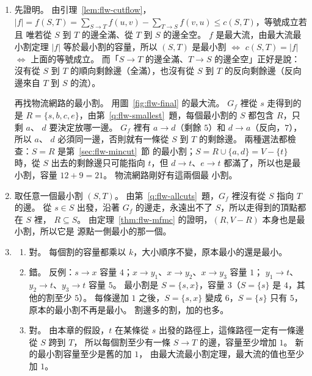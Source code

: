 \begin{enumerate}
第 1 輪 $1 \to 3$、$3 \to t$ 同時滿了（瓶頸 $4$）；第 2 輪 $s \to 1$ 滿了，之後 $1$ 只能經
過 $2 \to 3$ 和反向邊 $3 \to 1$ 到達，距離變成 $3$。 第 4 輪的路徑經過反向邊 $3 \to 1$：
$1 \to 3$ 上的 $4$ 單位退回 $2$ 單位，改走 $1 \to 4 \to t$，$3$ 少掉的由 $2 \to 3$ 補上。
最後的流量：$s \to 1$：$5$、$s \to 2$：$4$、$1 \to 2$：$0$、$1 \to 3$：$2$、$1 \to 4$：
$3$、$2 \to 3$：$2$、$2 \to 4$：$2$、$4 \to 3$：$0$、$3 \to t$：$4$、$4 \to t$：$5$，值 $9$。
最小割 $S = \{s, 2\}$、$T = \{1, 3, 4, t\}$，割邊 $s \to 1$、$2 \to 3$、$2 \to 4$，容量
$5 + 2 + 2 = 9$；從 $T$ 指回 $S$ 的 $1 \to 2$ 不算，它的流量是 $0$。 這張網路的最小割只有這
一個（可以用第~\ref{q:flw-allcuts}~題的方法驗證）。

\item 先證明。 由引理~\ref{lem:flw-cutflow}，
$|f| = f(S, T) = \sum_{S \to T} f(u, v) - \sum_{T \to S} f(v, u) \le c(S, T)$，等號成立若且
唯若從 $S$ 到 $T$ 的邊全滿、從 $T$ 到 $S$ 的邊全空。 $f$ 是最大流，由最大流最小割定理
$|f|$ 等於最小割的容量，所以 $(S, T)$ 是最小割 $\Leftrightarrow$ $c(S, T) = |f|$
$\Leftrightarrow$ 上面的等號成立。 而「$S \to T$ 的邊全滿、$T \to S$ 的邊全空」正好是說：
沒有從 $S$ 到 $T$ 的順向剩餘邊（全滿），也沒有從 $S$ 到 $T$ 的反向剩餘邊（反向邊來自 $T$
到 $S$ 的流）。

再找物流網路的最小割。 用圖~\ref{fig:flw-final} 的最大流。 $G_f$ 裡從 $s$ 走得到的是
$R = \{s, b, c, e\}$，由第~\ref{q:flw-smallest}~題，每個最小割的 $S$ 都包含 $R$，只剩 $a$、
$d$ 要決定放哪一邊。 $G_f$ 裡有 $a \to d$（剩餘 $5$）和 $d \to a$（反向，$7$），所以 $a$、
$d$ 必須同一邊，否則就有一條從 $S$ 到 $T$ 的剩餘邊。 兩種選法都檢查：$S = R$ 是第~\ref{sec:flw-mincut}~節
的最小割；$S = R \cup \{a, d\} = V - \{t\}$ 時，從 $S$ 出去的剩餘邊只可能指向 $t$，但
$d \to t$、$e \to t$ 都滿了，所以也是最小割，容量 $12 + 9 = 21$。 物流網路剛好有這兩個最
小割。

\item 取任意一個最小割 $(S, T)$。 由第~\ref{q:flw-allcuts}~題，$G_f$ 裡沒有從 $S$ 指向 $T$
的邊。 從 $s \in S$ 出發，沿著 $G_f$ 的邊走，永遠出不了 $S$，所以走得到的頂點都在 $S$ 裡，
$R \subseteq S$。 由定理~\ref{thm:flw-mfmc} 的證明，$(R, V - R)$ 本身也是最小割，所以它是
源點一側最小的那一個。

\item
\begin{enumerate}
\item 對。 每個割的容量都乘以 $k$，大小順序不變，原本最小的還是最小。
\item 錯。 反例：$s \to x$ 容量 $4$；$x \to y_1$、$x \to y_2$、$x \to y_3$ 容量 $1$；
$y_1 \to t$、$y_2 \to t$、$y_3 \to t$ 容量 $5$。 最小割是 $S = \{s, x\}$，容量 $3$（$S = \{s\}$
是 $4$，其他的割至少 $5$）。 每條邊加 $1$ 之後，$S = \{s, x\}$ 變成 $6$，$S = \{s\}$ 只有
$5$，原本的最小割不再是最小。 割邊多的割，加的也多。
\item 對。 由本章的假設，$t$ 在某條從 $s$ 出發的路徑上，這條路徑一定有一條邊從 $S$ 跨到 $T$，
所以每個割至少有一條 $S \to T$ 的邊，容量至少增加 $1$。 新的最小割容量至少是舊的加 $1$，
由最大流最小割定理，最大流的值也至少加 $1$。
\end{enumerate}


\end{enumerate}
